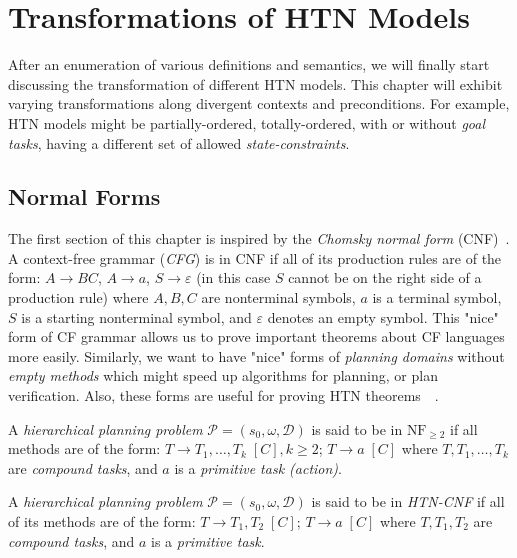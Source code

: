 \chapter{Transformations of {HTN} {M}odels}

\medskip\noindent
After an enumeration of various definitions and semantics, we will finally start discussing the transformation of different HTN models. This chapter will exhibit varying transformations along divergent contexts and preconditions. For example, HTN models might be partially-ordered, totally-ordered, with or without \emph{goal tasks}, having a different set of allowed \emph{state-constraints}.

\section{Normal Forms}

\medskip\noindent
The first section of this chapter is inspired by the \emph{Chomsky normal form} (CNF)~\cite{chytil}. A context-free grammar (\emph{CFG}) is in CNF if all of its production rules are of the form: $A \rightarrow BC$, $A \rightarrow a$, $S \rightarrow \varepsilon$ (in this case $S$ cannot be on the right side of a production rule) where $A, B, C$ are nonterminal symbols, $a$ is a terminal symbol, $S$ is a starting nonterminal symbol, and $\varepsilon$ denotes an empty symbol. This "nice" form of CF grammar allows us to prove important theorems about CF languages more easily. Similarly, we want to have "nice" forms of \emph{planning domains} without \emph{empty methods} which might speed up algorithms for planning, or plan verification. Also, these forms are useful for proving HTN theorems~\cite{langclassification}~\cite{cmyk}.

\begin{defn}\label{def04:14} \cite{langclassification}
    A \emph{hierarchical planning problem} $\mathcal{P} = (s_0,\omega,\mathcal{D})$ is said to be in $\text{NF}_{\geq 2}$ if all methods are of the form: $T \rightarrow T_1, \dots, T_k \; [C], k \geq 2$; $T \rightarrow a \; [C]$ where $T, T_1, \dots, T_k$ are \emph{compound tasks}, and $a$ is a \emph{primitive task (action)}.
\end{defn}

\begin{defn}\label{def04:15}
    A \emph{hierarchical planning problem} $\mathcal{P} = (s_0,\omega,\mathcal{D})$ is said to be in \emph{HTN-CNF} if all of its methods are of the form: $T \rightarrow T_1, T_2 \; [C]$; $T \rightarrow a \; [C]$ where $T, T_1, T_2$ are \emph{compound tasks}, and $a$ is a \emph{primitive task}. 
\end{defn}

